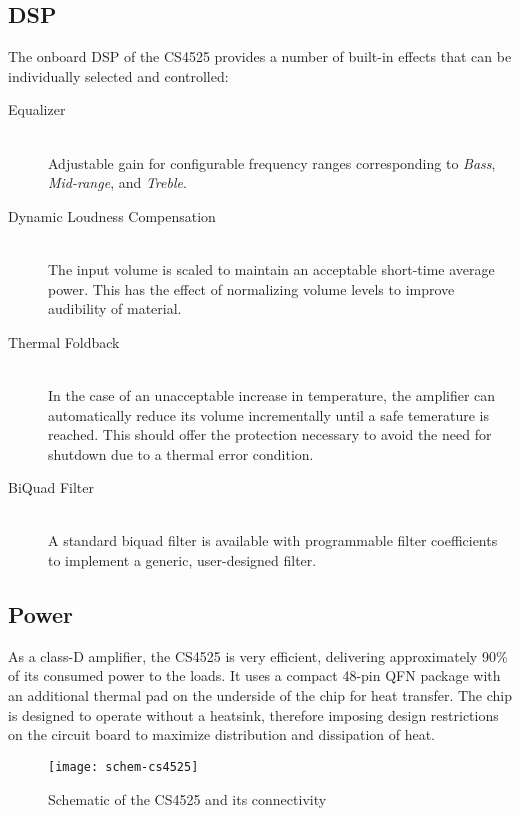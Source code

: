 \subsection{DSP}
\label{sec:dsp}
The onboard DSP of the CS4525 provides a number of built-in effects that can be individually selected and controlled:
\begin{description}
\item[Equalizer] \hfill \\
Adjustable gain for configurable frequency ranges corresponding to \emph{Bass}, \emph{Mid-range}, and \emph{Treble}. 
\item[Dynamic Loudness Compensation] \hfill \\
The input volume is scaled to maintain an acceptable short-time average power. This has the effect of normalizing volume levels to improve audibility of material.
\item[Thermal Foldback] \hfill \\
In the case of an unacceptable increase in temperature, the amplifier can automatically reduce its volume incrementally until a safe temerature is reached. This should offer the protection necessary to avoid the need for shutdown due to a thermal error condition.
\item[BiQuad Filter] \hfill \\
A standard biquad filter is available with programmable filter coefficients to implement a generic, user-designed filter.
\end{description}

\subsection{Power}
As a class-D amplifier, the CS4525 is very efficient, delivering approximately 90\% of its consumed power to the loads. It uses a compact 48-pin QFN package with an additional thermal pad on the underside of the chip for heat transfer. The chip is designed to operate without a heatsink, therefore imposing design restrictions on the circuit board to maximize distribution and dissipation of heat.
\begin{figure}[H]
	\centering
	\texttt{[image: schem-cs4525]}
	\caption[Schematic -- CS4525 Amplifier]%
	{Schematic of the CS4525 and its connectivity}
\end{figure}


